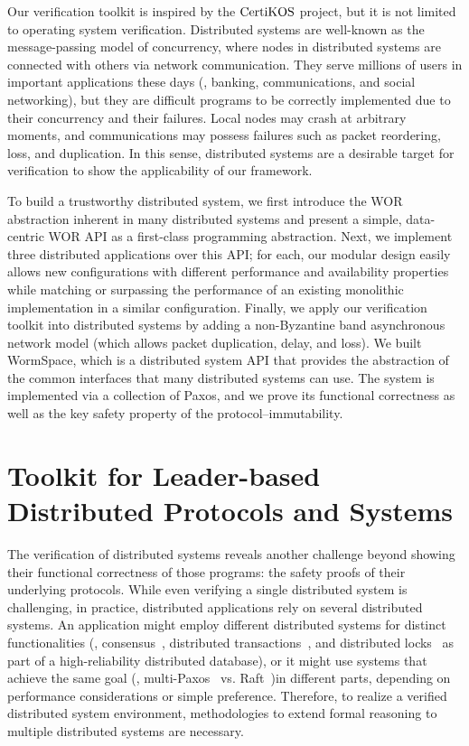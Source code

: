 Our verification toolkit is inspired by the $\mathrm{CertiKOS}$ project, but it is not limited to operating system verification. 
Distributed systems are well-known as the message-passing model of concurrency, where nodes in distributed systems are connected with 
others via network communication. They serve millions of users in important applications
 these days (\ie, banking, communications, and social networking), but they are difficult programs to be correctly implemented 
 due to their concurrency and their failures. Local nodes may crash at arbitrary moments, and communications may possess failures 
 such as packet reordering, loss, and duplication. In this sense, distributed systems are a desirable target for verification to 
 show the applicability of our framework.

To build a trustworthy distributed system, we first introduce the WOR abstraction inherent in many distributed systems and present a simple, 
data-centric WOR API as a first-class programming abstraction.  
Next, we implement three distributed applications over this API; for each, our modular design easily allows new configurations 
with different performance and availability properties while matching or surpassing the performance of an existing monolithic implementation 
in a similar configuration. Finally, we apply our verification toolkit into distributed systems by adding a 
non-Byzantine band asynchronous network model (which allows packet duplication, delay, and loss). We built WormSpace, 
which is a distributed system API that provides the abstraction of the common interfaces that many distributed systems can use. 
The system is implemented via a collection of Paxos, and we prove its functional correctness as well as the key safety property of the 
protocol--immutability.


\section{Toolkit for Leader-based Distributed Protocols and Systems}
\label{chapter:introduction:sec:toolkit-for-leader-based-distributed-protocols-and-systems}


The verification of distributed systems reveals another challenge beyond showing their functional correctness of those programs: 
the safety proofs of their underlying protocols. While even verifying a single distributed system is challenging, in practice, distributed applications 
rely on several distributed systems. An application might employ different distributed systems for distinct functionalities (\eg,
consensus~\cite{vivaladifference}, distributed transactions~\cite{gray:2006},
and distributed locks~\cite{chubby, zookeeper} as part of a high-reliability distributed database),
or it might use systems that achieve the same goal 
 (\eg,
multi-Paxos~\cite{paxosmadesimple, rvrpaxos} vs. Raft~\cite{raft})in different parts, depending on performance considerations or simple preference.
 Therefore, to realize a verified distributed system environment, methodologies to extend formal reasoning to multiple distributed systems are necessary.

